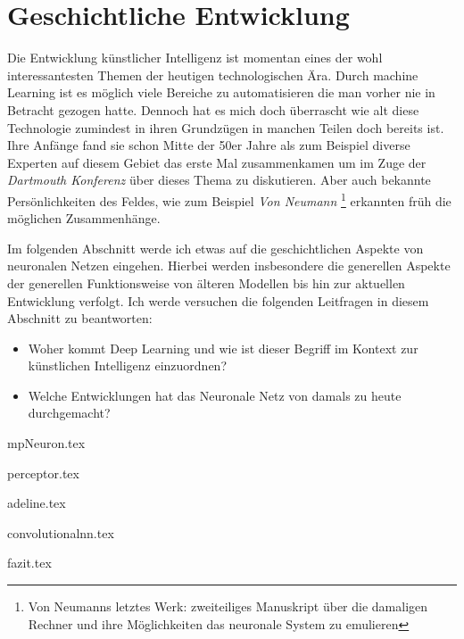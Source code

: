 \part{Geschichtliche Entwicklung}

Die Entwicklung künstlicher Intelligenz ist momentan eines der wohl interessantesten Themen der heutigen technologischen Ära. Durch machine Learning ist es möglich viele Bereiche zu automatisieren die man vorher nie in Betracht gezogen hatte. Dennoch hat es mich doch überrascht wie \glqq alt \grqq diese Technologie zumindest in ihren Grundzügen in manchen Teilen doch bereits ist. Ihre Anfänge fand sie schon Mitte der 50er Jahre als zum Beispiel diverse Experten auf diesem Gebiet das erste Mal zusammenkamen um im Zuge der \emph{Dartmouth Konferenz} über dieses Thema zu diskutieren. Aber auch bekannte Persönlichkeiten des Feldes, wie zum Beispiel \emph{Von Neumann} \footnote{Von Neumanns letztes Werk: zweiteiliges Manuskript über die damaligen Rechner und ihre Möglichkeiten das neuronale System zu emulieren} erkannten früh die möglichen Zusammenhänge.

Im folgenden Abschnitt werde ich etwas auf die geschichtlichen Aspekte von neuronalen Netzen eingehen. Hierbei werden insbesondere die generellen Aspekte der generellen Funktionsweise von älteren Modellen bis hin zur aktuellen Entwicklung verfolgt. Ich werde versuchen die folgenden Leitfragen in diesem Abschnitt zu beantworten: 

\begin{itemize}
\item Woher kommt Deep Learning und wie ist dieser Begriff im Kontext zur künstlichen Intelligenz einzuordnen?
\item Welche Entwicklungen hat das Neuronale Netz von damals zu heute durchgemacht?
\end{itemize}


{mpNeuron.tex}
\clearpage

{perceptor.tex}
\clearpage

{adeline.tex}
\clearpage

{convolutionalnn.tex}
\clearpage

{fazit.tex}